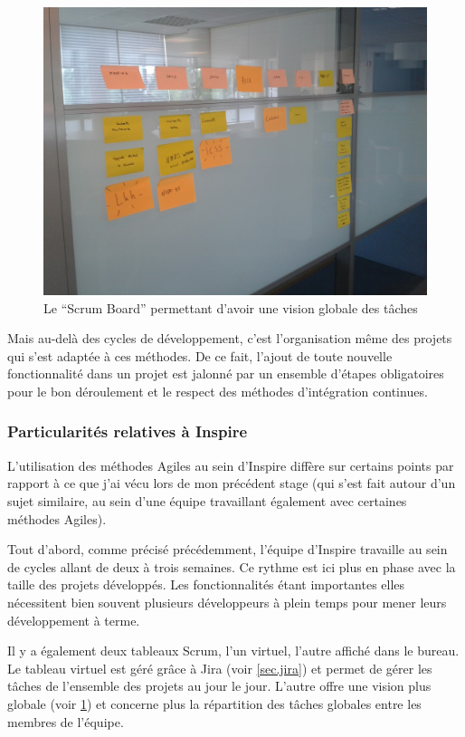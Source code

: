 \documentclass[12pt,a4paper]{book}
\begin{document}
\begin{figure}[htp]
\centering
\includegraphics[scale=.40]{img/agile1.jpg}
 \caption{Le ``Scrum Board'' permettant d'avoir une vision globale des tâches}
 \label{fig.agile1}
\end{figure}

Mais au-delà des cycles de développement, c'est l'organisation même des projets qui s'est adaptée à ces méthodes. De ce fait, l'ajout de toute nouvelle fonctionnalité dans un projet est jalonné par un ensemble d'étapes obligatoires pour le bon déroulement et le respect des méthodes d'intégration continues.

\subsubsection{Particularités relatives à Inspire}

L'utilisation des méthodes Agiles au sein d'Inspire diffère sur certains points par rapport à ce que j'ai vécu lors de mon précédent stage (qui s'est fait autour d'un sujet similaire, au sein d'une équipe travaillant également avec certaines méthodes Agiles).

Tout d'abord, comme précisé précédemment, l'équipe d'Inspire travaille au sein de cycles allant de deux à trois semaines. Ce rythme est ici plus en phase avec la taille des projets développés. Les fonctionnalités étant importantes elles nécessitent bien souvent plusieurs développeurs à plein temps pour mener leurs développement à terme. 

Il y a également deux tableaux Scrum, l'un virtuel, l'autre affiché dans le bureau. Le tableau virtuel est géré grâce à Jira (voir \cref{sec.jira}) et permet de gérer les tâches de l'ensemble des projets au jour le jour. L'autre offre une vision plus globale (voir \cref{fig.agile1}) et concerne plus la répartition des tâches globales entre les membres de l'équipe.
\end{document}
